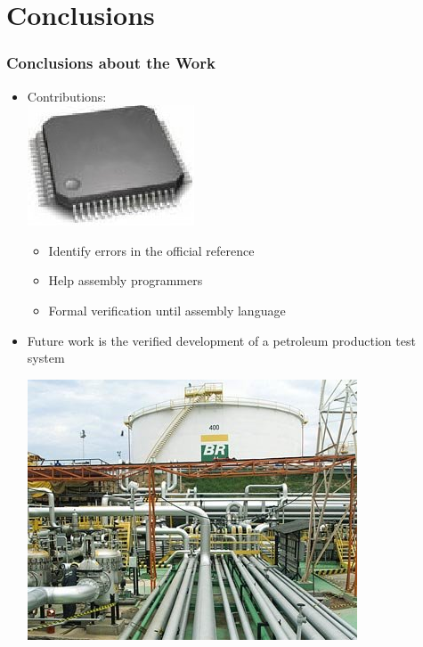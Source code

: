 \section{Conclusions}





 \begin{frame}
 \frametitle{Conclusions about the Work}
    
 \begin{itemize}
   \item Contributions: \ \ \ \ \ \ \ \ \ \ \ \ \ \ \ \ \ \ \ \ \ \ \ \ \ \ \ \ \ \ \
    \includegraphics[width=.2\textwidth]{figures/processador_generico.jpg}
 	\begin{itemize} 
 	  \item Identify  errors in the official reference
 	  \item Help assembly programmers
 	  \item Formal verification until assembly language 
     \end{itemize} 
     \item Future work is the verified development of a petroleum production test system\\ 
     \begin{center}   
 	   \includegraphics[height=.25\textheight]{figures/dutos.png}
	 \end{center}%
     
 \end{itemize} 
  	
 \end{frame}


